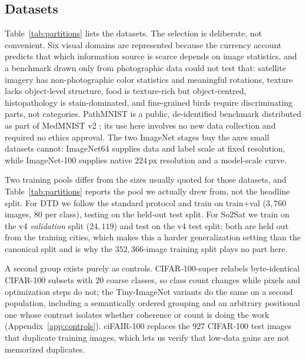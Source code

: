 \subsection{Datasets}\label{sec:datasets}


Table~\ref{tab:partitions} lists the datasets. The selection is deliberate, not convenient. Six visual domains are represented
because the currency account predicts that which information source is
scarce depends on image statistics, and a benchmark drawn only from
photographic data could not test that: satellite imagery has
non-photographic color statistics and meaningful rotations, texture
lacks object-level structure, food is texture-rich but object-centred,
histopathology is stain-dominated, and
fine-grained birds require discriminating parts, not categories.
PathMNIST is a public, de-identified benchmark distributed as part of
MedMNIST v2 \citep{yang2023medmnist}; its use here involves no new data
collection and required no ethics approval.
The two ImageNet stages buy the axes small datasets cannot: ImageNet64
supplies data and label scale at fixed resolution, while ImageNet-100
supplies native $224$\,px resolution and a model-scale curve.

Two training pools differ from the sizes usually quoted for those
datasets, and Table~\ref{tab:partitions} reports the pool we actually drew from, not the headline split. For DTD we follow the standard
protocol and train on train${+}$val ($3{,}760$ images, 80 per class),
testing on the held-out test split. For So2Sat we train on the v4
\emph{validation} split ($24{,}119$) and test on the v4 test split: both
are held out from the training cities, which makes this a harder
generalization setting than the canonical split and is why the
$352{,}366$-image training split plays no part here.

A second group exists purely as controls. CIFAR-100-super relabels
byte-identical CIFAR-100 subsets with 20 coarse classes, so class count
changes while pixels and optimization steps do not; the Tiny-ImageNet
variants do the same on a second population, including a semantically
ordered grouping and an arbitrary positional one whose contrast isolates
whether coherence or count is doing the work
(Appendix~\ref{app:controls}). ciFAIR-100 replaces the 927 CIFAR-100 test
images that duplicate training images, which lets us verify that low-data
gains are not memorized duplicates.

